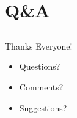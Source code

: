 \documentclass[aspectratio=169]{beamer}
\begin{document}
\section{Q\&A}
\subsection{}

\begin{frame}{Thanks Everyone!}
    \begin{itemize}
    \item Questions?
    \item Comments?
    \item Suggestions?
    \end{itemize}
\end{frame}
%
%
%
%
%
%
\end{document}

